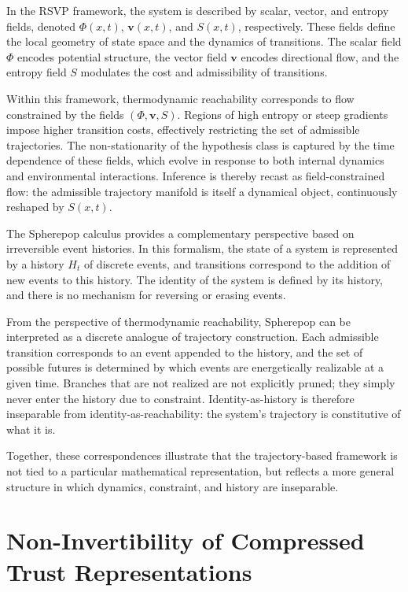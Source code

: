 \documentclass[12pt]{article}
\theoremstyle{plain}
\theoremstyle{definition}
\theoremstyle{remark}
\begin{document}
In the RSVP framework, the system is described by scalar, vector, and entropy fields, denoted $\Phi(x,t)$, $\mathbf{v}(x,t)$, and $S(x,t)$, respectively. These fields define the local geometry of state space and the dynamics of transitions. The scalar field $\Phi$ encodes potential structure, the vector field $\mathbf{v}$ encodes directional flow, and the entropy field $S$ modulates the cost and admissibility of transitions.

Within this framework, thermodynamic reachability corresponds to flow constrained by the fields $(\Phi, \mathbf{v}, S)$. Regions of high entropy or steep gradients impose higher transition costs, effectively restricting the set of admissible trajectories. The non-stationarity of the hypothesis class is captured by the time dependence of these fields, which evolve in response to both internal dynamics and environmental interactions. Inference is thereby recast as field-constrained flow: the admissible trajectory manifold is itself a dynamical object, continuously reshaped by $S(x,t)$.

The Spherepop calculus provides a complementary perspective based on irreversible event histories. In this formalism, the state of a system is represented by a history $H_t$ of discrete events, and transitions correspond to the addition of new events to this history. The identity of the system is defined by its history, and there is no mechanism for reversing or erasing events.

From the perspective of thermodynamic reachability, Spherepop can be interpreted as a discrete analogue of trajectory construction. Each admissible transition corresponds to an event appended to the history, and the set of possible futures is determined by which events are energetically realizable at a given time. Branches that are not realized are not explicitly pruned; they simply never enter the history due to constraint. Identity-as-history is therefore inseparable from identity-as-reachability: the system's trajectory is constitutive of what it is.

Together, these correspondences illustrate that the trajectory-based framework is not tied to a particular mathematical representation, but reflects a more general structure in which dynamics, constraint, and history are inseparable.

\section{Non-Invertibility of Compressed Trust Representations}
\end{document}
